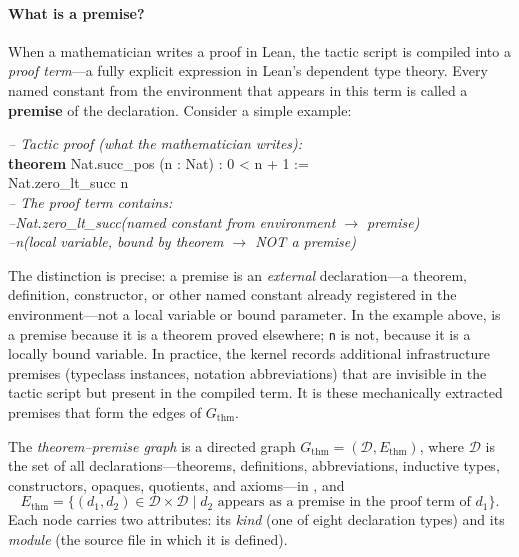 \paragraph{What is a premise?}
When a mathematician writes a proof in Lean, the tactic script is compiled into a \emph{proof term}---a fully explicit expression in Lean's dependent type theory. Every named constant from the environment that appears in this term is called a \textbf{premise} of the declaration. Consider a simple example:

\begin{codebox}
\textit{\color{gray}-- Tactic proof (what the mathematician writes):}\\
\textbf{theorem} \textcolor{red!70!black}{Nat.succ\_pos} (n : Nat) : 0 < n + 1 :=\\
\hspace{1.5em}\textcolor{red!70!black}{Nat.zero\_lt\_succ} n\\[3pt]
\textit{\color{gray}-- The proof term contains:}\\
\textit{\color{gray}--\hspace{0.5em}Nat.zero\_lt\_succ\hspace{1em}(named constant from environment $\to$ premise)}\\
\textit{\color{gray}--\hspace{0.5em}n\hspace{6.3em}(local variable, bound by theorem $\to$ NOT a premise)}
\end{codebox}

\noindent
The distinction is precise: a premise is an \emph{external} declaration---a theorem, definition, constructor, or other named constant already registered in the environment---not a local variable or bound parameter. In the example above,  is a premise because it is a theorem proved elsewhere; \texttt{n} is not, because it is a locally bound variable. In practice, the kernel records additional infrastructure premises (typeclass instances, notation abbreviations) that are invisible in the tactic script but present in the compiled term. It is these mechanically extracted premises that form the edges of $G_{\mathrm{thm}}$.

\begin{definition}
\label{def:thm-graph}
The \emph{theorem--premise graph} is a directed graph $G_{\mathrm{thm}} = (\mathcal{D}, E_{\mathrm{thm}})$, where $\mathcal{D}$ is the set of all declarations---theorems, definitions, abbreviations, inductive types, constructors, opaques, quotients, and axioms---in , and
\[
  E_{\mathrm{thm}} = \{(d_1, d_2) \in \mathcal{D} \times \mathcal{D} \mid d_2 \text{ appears as a premise in the proof term of } d_1\}.
\]
Each node carries two attributes: its \emph{kind} (one of eight declaration types) and its \emph{module} (the source file in which it is defined).
\end{definition}

